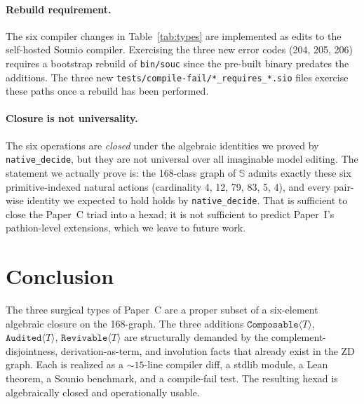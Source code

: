 \documentclass{article}
\newcommand{\sio}{\mathbb{S}}
\newcommand{\Composable}[1]{\texttt{Composable}\langle #1 \rangle}
\newcommand{\Audited}[1]{\texttt{Audited}\langle #1 \rangle}
\newcommand{\Revivable}[1]{\texttt{Revivable}\langle #1 \rangle}
\begin{document}
\paragraph{Rebuild requirement.}
The six compiler changes in Table~\ref{tab:types} are implemented as
edits to the self-hosted Sounio compiler.  Exercising the three new
error codes (204, 205, 206) requires a bootstrap rebuild of
\texttt{bin/souc} since the pre-built binary predates the additions.
The three new \texttt{tests/compile-fail/*\_requires\_*.sio} files
exercise these paths once a rebuild has been performed.

\paragraph{Closure is not universality.}
The six operations are \emph{closed} under the algebraic identities we
proved by \texttt{native\_decide}, but they are not universal over
all imaginable model editing.  The statement we actually prove
is: the 168-class graph of $\sio$ admits exactly these six
primitive-indexed natural actions (cardinality 4, 12, 79, 83, 5, 4),
and every pair-wise identity we expected to hold holds by
\texttt{native\_decide}.  That is sufficient to close the Paper~C
triad into a hexad; it is not sufficient to predict Paper~I's
pathion-level extensions, which we leave to future work.

\section{Conclusion}

The three surgical types of Paper~C are a proper subset of a
six-element algebraic closure on the 168-graph.  The three additions
$\Composable{T}$, $\Audited{T}$, $\Revivable{T}$ are structurally
demanded by the complement-disjointness, derivation-as-term, and
involution facts that already exist in the ZD graph.  Each is
realized as a $\sim 15$-line compiler diff, a stdlib module, a
Lean theorem, a Sounio benchmark, and a compile-fail test.  The
resulting hexad is algebraically closed and operationally usable.
\end{document}
